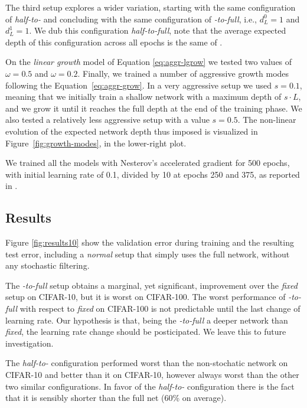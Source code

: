 \documentclass{sig-alternate}
\begin{document}
The third setup explores a wider variation, starting with the same configuration of \emph{half-to-\cite{huang2016deep}} and concluding with the same configuration of \emph{\cite{huang2016deep}-to-full}, i.e., $d_L^0 = 1$ and $d_L^1 = 1$.
We dub this configuration \emph{half-to-full}, note that the average expected depth of this configuration across all epochs is the same of \cite{huang2016deep}. 

On the \emph{linear growth} model of Equation \ref{eq:aggr-lgrow} we tested two values of $\omega=0.5$ and $\omega=0.2$.
Finally, we trained a number of aggressive growth modes following the Equation~\ref{eq:aggr-grow}. 
In a very aggressive setup we used $s = 0.1$, meaning that we initially train a shallow network with a maximum depth of $s \cdot L$, and we grow it until it reaches the full depth at the end of the training phase.
We also tested a relatively less aggressive setup with a value $s=0.5$.
The non-linear evolution of the expected network depth thus imposed is visualized in Figure~\ref{fig:growth-modes}, in the lower-right plot.

We trained all the models with Nesterov's accelerated gradient for 500 epochs, with initial learning rate of 0.1, divided by 10 at epochs 250 and 375, as reported in \cite{huang2016deep}.

\subsection{Results}
Figure \ref{fig:results10} show the validation error during training and the resulting test error, including a \emph{normal} setup that simply uses the full network, without any stochastic filtering.

The \emph{\cite{huang2016deep}-to-full} setup obtains a  marginal, yet significant, improvement over the \emph{fixed} setup on CIFAR-10, but it is worst on CIFAR-100.
The worst performance of \emph{\cite{huang2016deep}-to-full} with respect to \emph{fixed} on CIFAR-100 is not predictable until the last change of learning rate.
Our hypothesis is that, being the \emph{\cite{huang2016deep}-to-full} a deeper network than \emph{fixed}, the learning rate change should be posticipated. 
We leave this to future investigation.

The \emph{half-to-\cite{huang2016deep}} configuration performed worst than the non-stochatic network on CIFAR-10 and better than it on CIFAR-10, however always worst than the other two similar configurations. 
In favor of the \emph{half-to-\cite{huang2016deep}} configuration there is the fact that it is sensibly shorter than the full net (60\% on average).
\end{document}
